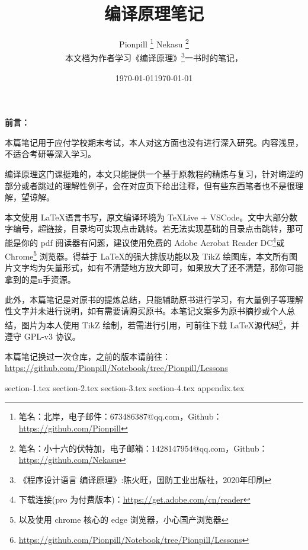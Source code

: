 \documentclass{PionpillNote-art}
\title{编译原理笔记}
\author{
    Pionpill \footnote{笔名：北岸，电子邮件：673486387@qq.com，Github：\url{https://github.com/Pionpill}} \quad Nekasu \footnote{笔名：小十六的伏特加，电子邮箱：1428147954@qq.com，Github：\url{https://github.com/Nekasu}} \\
    本文档为作者学习《编译原理》\footnote{《程序设计语言 编译原理》:陈火旺，国防工业出版社，2020年印刷}一书时的笔记，\\
}
\date{\today}
\begin{document}
\maketitle

\noindent\textbf{前言：}

本篇笔记用于应付学校期末考试，本人对这方面也没有进行深入研究。内容浅显，不适合考研等深入学习。

编译原理这门课挺难的，本文只能提供一个基于原教程的精炼与复习，针对晦涩的部分或者跳过的理解性例子，会在对应页下给出注释，但有些东西笔者也不是很理解，望谅解。

本文使用 \LaTeX 语言书写，原文编译环境为 TeXLive + VSCode。文中大部分数字编号，超链接，目录均可实现点击跳转。若无法实现基础的目录点击跳转，那可能是你的 pdf 阅读器有问题，建议使用免费的 Adobe Acrobat Reader DC\footnote{下载连接(pro 为付费版本)：\url{https://get.adobe.com/cn/reader}}或 Chrome\footnote{以及使用 chrome 核心的 edge 浏览器，小心国产浏览器} 浏览器。得益于 \LaTeX 的强大排版功能以及 TikZ 绘图库，本文所有图片文字均为矢量形式，如有不清楚地方放大即可，如果放大了还不清楚，那你可能拿到的是n手资源。

此外，本篇笔记是对原书的提炼总结，只能辅助原书进行学习，有大量例子等理解性文字并未进行说明，如有需要请购买原书。本笔记文案多为原书摘抄或个人总结，图片为本人使用 TikZ 绘制，若需进行引用，可前往下载 \LaTeX 源代码\footnote{\url{https://github.com/Pionpill/Notebook/tree/Pionpill/Lessons}}，并遵守 GPL-v3 协议。

本篇笔记换过一次仓库，之前的版本请前往：\url{https://github.com/Pionpill/Notebook/tree/Pionpill/Lessons}

\date{\today}

\newpage

\tableofcontents
\thispagestyle{empty}
\newpage
\setcounter{page}{1} 

{section-1.tex}
{section-2.tex}
{section-3.tex}
{section-4.tex}
{appendix.tex}
\end{document}
